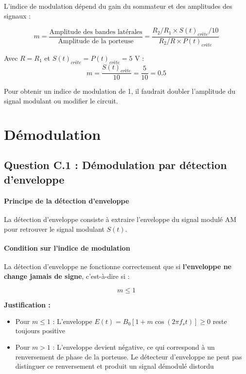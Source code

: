 \documentclass[11pt,a4paper]{article}
\begin{document}
L'indice de modulation dépend du gain du sommateur et des amplitudes des signaux :

\begin{equation}
m = \frac{\text{Amplitude des bandes latérales}}{\text{Amplitude de la porteuse}} = \frac{R_2/R_1 \times S(t)_{crête}/10}{R_2/R \times P(t)_{crête}}
\end{equation}

Avec $R = R_1$ et $S(t)_{crête} = P(t)_{crête} = 5$ V :
\begin{equation}
\boxed{m = \frac{S(t)_{crête}}{10} = \frac{5}{10} = 0.5}
\end{equation}

Pour obtenir un indice de modulation de 1, il faudrait doubler l'amplitude du signal modulant ou modifier le circuit.

\section{Démodulation}

\subsection{Question C.1 : Démodulation par détection d'enveloppe}

\paragraph{Principe de la détection d'enveloppe}

La détection d'enveloppe consiste à extraire l'enveloppe du signal modulé AM pour retrouver le signal modulant $S(t)$.

\paragraph{Condition sur l'indice de modulation}

La détection d'enveloppe ne fonctionne correctement que si \textbf{l'enveloppe ne change jamais de signe}, c'est-à-dire si :

\begin{equation}
\boxed{m \leq 1}
\end{equation}

\textbf{Justification :}
\begin{itemize}
    \item Pour $m \leq 1$ : L'enveloppe $E(t) = B_0[1 + m\cos(2\pi f_s t)] \geq 0$ reste toujours positive
    \item Pour $m > 1$ : L'enveloppe devient négative, ce qui correspond à un renversement de phase de la porteuse. Le détecteur d'enveloppe ne peut pas distinguer ce renversement et produit un signal démodulé distordu
\end{itemize}
\end{document}
